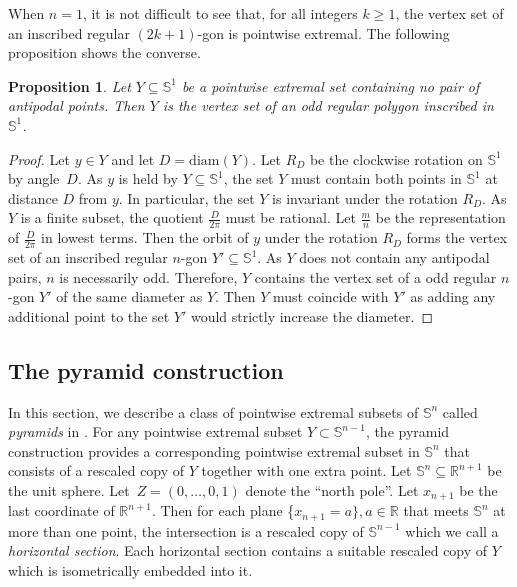 \documentclass[12pt]{amsart}
\theoremstyle{plain}
\newtheorem{proposition}[theorem]{Proposition}
\newcommand{\R}{\mathbb{R}}
\newcommand{\Sp}{\mathbb{S}}
\newcommand{\diam}{\mathrm{diam}}
\newcommand{\np}{Z}
\numberwithin{equation}{section}
\begin{document}
When $n=1$, it is not difficult to see that, for all integers $k\geq
1$, the vertex set of an inscribed regular $(2k+1)$-gon is pointwise
extremal.  The following proposition shows the converse.


\begin{proposition}\label{prop:one_dim_pointwise extremal configurations_is_odd_gon}
Let $Y\subseteq \Sp^1$ be a pointwise extremal set containing no pair
of antipodal points.  Then $Y$ is the vertex set of an odd regular
polygon inscribed in $\Sp^1$.
\end{proposition}


\begin{proof}
Let $y\in Y$ and let $D=\diam (Y)$.  Let $R_D$ be the clockwise rotation
on $\Sp^1$ by angle~$D$.  As $y$ is held by $Y\subseteq \Sp^1$, the
set $Y$ must contain both points in $\Sp^1$ at distance $D$ from $y$.
In particular, the set $Y$ is invariant under the rotation $R_D$.  As
$Y$ is a finite subset, the quotient $\frac{D}{2\pi}$ must be
rational.  Let $\frac{m}{n}$ be the representation of $\frac{D}{2\pi}$
in lowest terms.  Then the orbit of $y$ under the rotation $R_D$ forms
the vertex set of an inscribed regular $n$-gon $Y'\subseteq\Sp^1$.  As
$Y$ does not contain any antipodal pairs, $n$ is necessarily odd.
Therefore, $Y$ contains the vertex set of a odd regular $n$-gon $Y'$
of the same diameter as $Y$.  Then $Y$ must coincide with $Y'$ as
adding any additional point to the set $Y'$ would strictly increase
the diameter.
\end{proof}

\subsection{The  pyramid construction}\label{subsec:pyramid_config}
In this section, we describe a class of pointwise extremal subsets of
$\Sp^n$ called \emph{pyramids} in \cite{katz1989diameter}. For any
pointwise extremal subset $Y\subset \Sp^{n-1}$, the pyramid
construction provides a corresponding pointwise extremal subset in
$\Sp^n$ that consists of a rescaled copy of $Y$ together with one
extra point.  Let $\Sp^n\subseteq\R^{n+1}$ be the unit sphere.
Let~$\np=(0,\dots,0,1)$ denote the ``north pole''.  Let $x_{n+1}$ be
the last coordinate of $\R^{n+1}$. Then for each plane \{$x_{n+1} =
a\}, a\in \R$ that meets $\Sp^n$ at more than one point, the
intersection is a rescaled copy of $\Sp^{n-1}$ which we call a
\emph{horizontal section}.  Each horizontal section contains a
suitable rescaled copy of $Y$ which is isometrically embedded into it.
\end{document}
